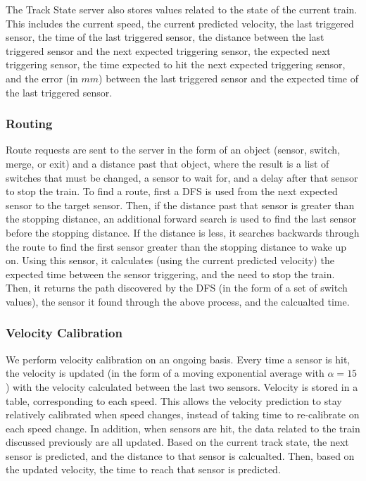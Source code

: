 \documentclass{article}
\begin{document}
The Track State server also stores values related to the state of the current train. This includes the current speed, the current predicted velocity, the last triggered sensor, the time of the last triggered sensor, the distance between the last triggered sensor and the next expected triggering sensor, the expected next triggering sensor, the time expected to hit the next expected triggering sensor, and the error (in $mm$) between the last triggered sensor and the expected time of the last triggered sensor.

\subsubsection{ Routing }
Route requests are sent to the server in the form of an object (sensor, switch, merge, or exit) and a distance past that object, where the result is a list of switches that must be changed, a sensor to wait for, and a delay after that sensor to stop the train.
To find a route, first a DFS is used from the next expected sensor to the target sensor. Then, if the distance past that sensor is greater than the stopping distance, an additional forward search is used to find the last sensor before the stopping distance. If the distance is less, it searches backwards through the route to find the first sensor greater than the stopping distance to wake up on.
Using this sensor, it calculates (using the current predicted velocity) the expected time between the sensor triggering, and the need to stop the train.
Then, it returns the path discovered by the DFS (in the form of a set of switch values), the sensor it found through the above process, and the calcualted time.

\subsubsection{ Velocity Calibration }
We perform velocity calibration on an ongoing basis. Every time a sensor is hit, the velocity is updated (in the form of a moving exponential average with $\alpha = 15$) with the velocity calculated between the last two sensors.
Velocity is stored in a table, corresponding to each speed. This allows the velocity prediction to stay relatively calibrated when speed changes, instead of taking time to re-calibrate on each speed change.
In addition, when sensors are hit, the data related to the train discussed previously are all updated. Based on the current track state, the next sensor is predicted, and the distance to that sensor is calcualted. Then, based on the updated velocity, the time to reach that sensor is predicted. 
\end{document}
